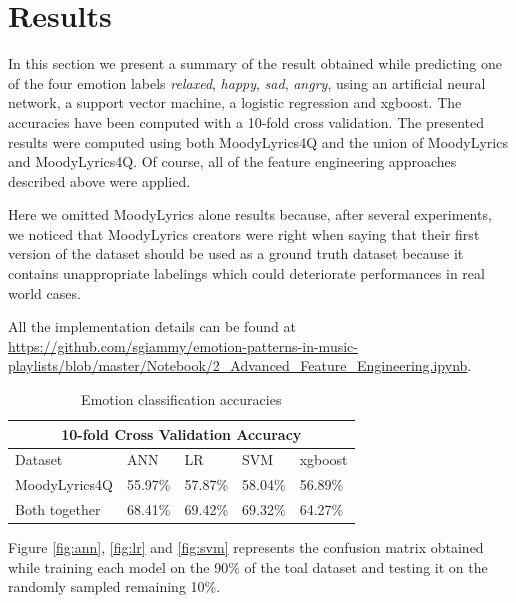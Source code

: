 \section{Results}
In this section we present a summary of the result obtained while predicting one of the four emotion labels \textit{relaxed}, \textit{happy}, \textit{sad}, \textit{angry}, using an artificial neural network, a support vector machine, a logistic regression and xgboost. The accuracies have been computed with a 10-fold cross validation. The presented results were computed using both MoodyLyrics4Q and the union of MoodyLyrics and MoodyLyrics4Q. Of course, all of the feature engineering approaches described above were applied.

Here we omitted MoodyLyrics alone results because, after several experiments, we noticed that MoodyLyrics creators were right when saying that their first version of the dataset should be used as a ground truth dataset because it contains unappropriate labelings which could deteriorate performances in real world cases.

All the implementation details can be found at \url{https://github.com/sgiammy/emotion-patterns-in-music-playlists/blob/master/Notebook/2_Advanced_Feature_Engineering.ipynb}.

\begin{table}[]
\centering
\begin{tabular}{ |p{3cm}||p{1.5cm}|p{1.5cm}|p{1.5cm}|p{1.5cm}|  }
 \hline
 \multicolumn{5}{|c|}{10-fold Cross Validation Accuracy} \\
 \hline
 Dataset & ANN & LR &SVM & xgboost\\
 \hline
MoodyLyrics4Q  & 55.97\%    &57.87\% &  58.04\% & 56.89\%\\
Both together &   68.41\%  & 69.42\%   &69.32\% &64.27\%\\
\hline
\end{tabular}
\caption{Emotion classification accuracies} \label{tab:comparison}
\end{table}

Figure \ref{fig:ann}, \ref{fig:lr} and \ref{fig:svm} represents the confusion matrix obtained while training each model on the 90\% of the toal dataset and testing it on the randomly sampled remaining 10\%.

